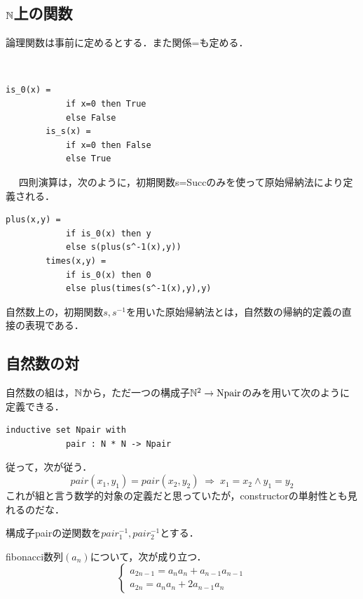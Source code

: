 \documentclass[uplatex, dvipdfmx]{jsreport}
\begin{document}
\subsection{$\mathbb{N}$上の関数}

論理関数は事前に定めるとする．また関係=も定める．

\begin{example}　
    
    \begin{lstlisting}[caption=isZero / isS]
        is_0(x) = 
            if x=0 then True
            else False
        is_s(x) = 
            if x=0 then False
            else True
    \end{lstlisting}
\end{example}

\begin{example}[四則演算]　
    四則演算は，次のように，初期関数s=Succのみを使って原始帰納法により定義される．
    \begin{lstlisting}[caption=plus / times]
        plus(x,y) =
            if is_0(x) then y
            else s(plus(s^-1(x),y))
        times(x,y) =
            if is_0(x) then 0
            else plus(times(s^-1(x),y),y)
    \end{lstlisting}
\end{example}

自然数上の，初期関数$s,s^{-1}$を用いた原始帰納法とは，自然数の帰納的定義の直接の表現である．

\subsection{自然数の対}

\begin{definition}[組]
    自然数の組は，$\mathbb{N}$から，ただ一つの構成子$\mathbb{N}^2\to\mathrm{Npair}$のみを用いて次のように定義できる．
    \begin{lstlisting}[caption=Npair]
        inductive set Npair with
            pair : N * N -> Npair
    \end{lstlisting}
    従って，次が従う．
    \[ pair(x_1,y_1)=pair(x_2,y_2)\;\Rightarrow\; x_1=x_2\land y_1=y_2 \]
    これが組と言う数学的対象の定義だと思っていたが，constructorの単射性とも見れるのだな．
\end{definition}
\begin{definition}
    構成子pairの逆関数を$pair_1^{-1},pair_2^{-1}$とする．
\end{definition}

\begin{proposition}
    fibonacci数列$(a_n)$について，次が成り立つ．
    \[ \begin{cases}
        a_{2n-1} = a_na_n+a_{n-1}a_{n-1}\\
        a_{2n} = a_na_n + 2a_{n-1}a_n
    \end{cases} \]
\end{proposition}
\end{document}
